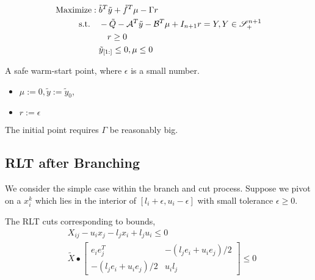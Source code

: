 \documentclass[../main]{subfiles}
\begin{document}
\begin{equation}
    \begin{aligned}
        \mathrm{Maximize:\;}           & \tilde b^T \tilde y + \tilde f^T \mu-\Gamma r                                                 \\
        \mathrm{s.t.} \quad & - \tilde{Q}-\mathcal{A}^T \tilde y - \mathcal{B}^T\mu +I_{n+1} r= Y, Y \in \mathscr S^{n+1}_+ \\
                            & \quad r \ge 0                                                                                 \\
                            & \tilde y_{[1:]} \le 0, \mu \le 0
    \end{aligned}
\end{equation}

A safe warm-start point, where \(\epsilon\) is a small number.
\begin{itemize}
    \item \(\mu := 0, \tilde{y} := \tilde y_0\),
    \item \(r := \epsilon \)
\end{itemize}

The initial point requires \(\Gamma\) be reasonably big.



\subsection{RLT after Branching}
We consider the simple case within the branch and cut process. Suppose we pivot on a \(x_i^k\) which lies in the interior of \(\left[l_i + \epsilon, u_i -\epsilon\right]\) with small tolerance \(\epsilon \ge 0\).

The RLT cuts corresponding to bounds,
\begin{align}
    \label{eq:ws.rlt.left} & X_{ij} - u_i x_j - l_j x_i + l_j u_i \le 0        \\
    \label{eq:ws.rlt.mat}  & \tilde X \bullet \begin{bmatrix}
        e_ie_j^T                  & - (l_j e_i + u_i e_j) / 2 \\
        - (l_j e_i + u_i e_j) / 2 & u_i l_j
    \end{bmatrix} \le 0
\end{align}
\end{document}
